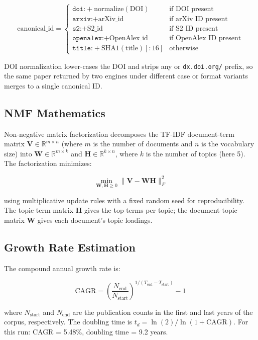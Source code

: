 \documentclass[
  english,
]{article}
\begin{document}
\[
\text{canonical\_id} = \begin{cases}
\texttt{doi:} + \text{normalize}(\text{DOI}) & \text{if DOI present} \\
\texttt{arxiv:} + \text{arXiv\_id} & \text{if arXiv ID present} \\
\texttt{s2:} + \text{S2\_id} & \text{if S2 ID present} \\
\texttt{openalex:} + \text{OpenAlex\_id} & \text{if OpenAlex ID present} \\
\texttt{title:} + \text{SHA1}(\text{title})[:16] & \text{otherwise}
\end{cases}
\]

DOI normalization lower-cases the DOI and strips any
 or \texttt{dx.doi.org/} prefix, so the same
paper returned by two engines under different case or format variants
merges to a single canonical ID.

\subsection{NMF Mathematics}\label{nmf-mathematics}

Non-negative matrix factorization decomposes the TF-IDF document-term
matrix \(\mathbf{V} \in \mathbb{R}^{m \times n}\) (where \(m\) is the
number of documents and \(n\) is the vocabulary size) into
\(\mathbf{W} \in \mathbb{R}^{m \times k}\) and
\(\mathbf{H} \in \mathbb{R}^{k \times n}\), where \(k\) is the number of
topics (here 5). The factorization minimizes:

\[
\min_{\mathbf{W}, \mathbf{H} \geq 0} \|\mathbf{V} - \mathbf{W} \mathbf{H}\|_F^2
\]

using multiplicative update rules \citep{lee1999learning} with a fixed
random seed for reproducibility. The topic-term matrix \(\mathbf{H}\)
gives the top terms per topic; the document-topic matrix \(\mathbf{W}\)
gives each document's topic loadings.

\subsection{Growth Rate Estimation}\label{growth-rate-estimation}

The compound annual growth rate is:

\[
\text{CAGR} = \left(\frac{N_{\text{end}}}{N_{\text{start}}}\right)^{1/(T_{\text{end}} - T_{\text{start}})} - 1
\]

where \(N_{\text{start}}\) and \(N_{\text{end}}\) are the publication
counts in the first and last years of the corpus, respectively. The
doubling time is \(t_d = \ln(2) / \ln(1 + \text{CAGR})\). For this run:
CAGR = 5.48\%, doubling time = 9.2 years.
\end{document}
